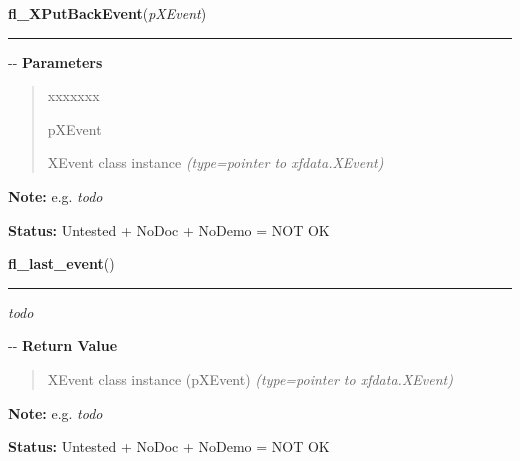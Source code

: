\hspace{.8\funcindent}\begin{boxedminipage}{\funcwidth}

    \raggedright \textbf{fl\_XPutBackEvent}(\textit{pXEvent})

    \vspace{-1.5ex}

    \rule{\textwidth}{0.5\fboxrule}
\setlength{\parskip}{2ex}

-{}-
\setlength{\parskip}{1ex}
      \textbf{Parameters}
      \vspace{-1ex}

      \begin{quote}
        \begin{Ventry}{xxxxxxx}

          \item[pXEvent]


XEvent class instance
            {\it (type=pointer to xfdata.XEvent)}

        \end{Ventry}

      \end{quote}

\textbf{Note:} 
e.g. \emph{todo}


\textbf{Status:} 
Untested + NoDoc + NoDemo = NOT OK


    \end{boxedminipage}

    \label{xformslib:flxbasic:fl_last_event}

    \vspace{0.5ex}

\hspace{.8\funcindent}\begin{boxedminipage}{\funcwidth}

    \raggedright \textbf{fl\_last\_event}()

    \vspace{-1.5ex}

    \rule{\textwidth}{0.5\fboxrule}
\setlength{\parskip}{2ex}

\emph{todo}

-{}-
\setlength{\parskip}{1ex}
      \textbf{Return Value}
    \vspace{-1ex}

      \begin{quote}

XEvent class instance (pXEvent)
      {\it (type=pointer to xfdata.XEvent)}

      \end{quote}

\textbf{Note:} 
e.g. \emph{todo}


\textbf{Status:} 
Untested + NoDoc + NoDemo = NOT OK


    \end{boxedminipage}

